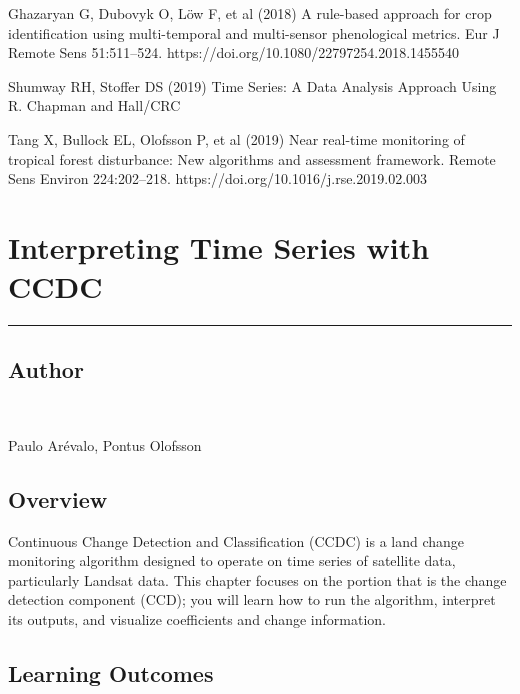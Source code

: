\documentclass[
  letterpaper,
  DIV=11,
  numbers=noendperiod]{scrreprt}
\begin{document}
Ghazaryan G, Dubovyk O, Löw F, et al (2018) A rule-based approach for
crop identification using multi-temporal and multi-sensor phenological
metrics. Eur J Remote Sens 51:511--524.
https://doi.org/10.1080/22797254.2018.1455540

Shumway RH, Stoffer DS (2019) Time Series: A Data Analysis Approach
Using R. Chapman and Hall/CRC

Tang X, Bullock EL, Olofsson P, et al (2019) Near real-time monitoring
of tropical forest disturbance: New algorithms and assessment framework.
Remote Sens Environ 224:202--218.
https://doi.org/10.1016/j.rse.2019.02.003

\hypertarget{interpreting-time-series-with-ccdc}{%
\chapter{Interpreting Time Series with
CCDC}\label{interpreting-time-series-with-ccdc}}

\begin{center}\rule{0.5\linewidth}{0.5pt}\end{center}

\hypertarget{author-12}{%
\section*{Author}\label{author-12}}


~

Paulo Arévalo, Pontus Olofsson

\hypertarget{overview-14}{%
\section*{Overview}\label{overview-14}}


Continuous Change Detection and Classification (CCDC) is a land change
monitoring algorithm designed to operate on time series of satellite
data, particularly Landsat data. This chapter focuses on the portion
that is the change detection component (CCD); you will learn how to run
the algorithm, interpret its outputs, and visualize coefficients and
change information.

\hypertarget{learning-outcomes-14}{%
\section*{Learning Outcomes}\label{learning-outcomes-14}}
\end{document}
